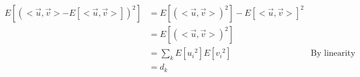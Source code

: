     \begin{align*}
        E[(<\vec{u},\vec{v}>-E[<\vec{u},\vec{v}>])^2] & = E[(<\vec{u},\vec{v}>)^2]
        - E[<\vec{u},\vec{v}>]^2                                                                                                \\
                                                      & = E[(<\vec{u},\vec{v}>)^2]                                              \\
                                                      & =  \sum_k E[{u_i}^2] E[{v_i}^2] & \text{By linearity of expectation and
        indepedence}                                                                                                            \\
                                                      & = d_k
    \end{align*}

\fi
